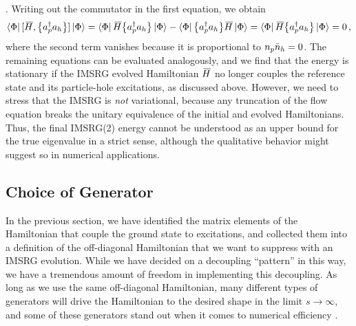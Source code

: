 \cite{Mukherjee:2001uq,Kutzelnigg:2002kx,Kutzelnigg:2004vn,Kutzelnigg:2004ys}. 
Writing out the commutator in the first equation, we obtain
\begin{equation}
  \langle{\Phi}|\,{[{\mkern 3mu\overline{\mkern-3muH}},{\big\{a^\dag_{p}a_{h}\big\}}]}\,|{\Phi}\rangle 
    = \langle{\Phi}|\,{\mkern 3mu\overline{\mkern-3muH}\big\{a^\dag_{p}a_{h}\big\}}\,|{\Phi}\rangle - \langle{\Phi}|\,{\big\{a^\dag_{p}a_{h}\big\}\mkern 3mu\overline{\mkern-3muH}}\,|{\Phi}\rangle
    = \langle{\Phi}|\,{\mkern 3mu\overline{\mkern-3muH}\big\{a^\dag_{p}a_{h}\big\}}\,|{\Phi}\rangle 
    = 0\,,
\end{equation}
where the second term vanishes because it is proportional to $n_p \bar{n}_h = 0$.
The remaining equations can be evaluated analogously, and we find that the
energy is stationary if the IMSRG evolved Hamiltonian $\mkern 3mu\overline{\mkern-3muH}$ no longer 
couples the reference state and its particle-hole excitations, as discussed 
above. However, we need to stress that the IMSRG is \emph{not} variational,
because any truncation of the flow equation breaks the unitary equivalence
of the initial and evolved Hamiltonians. Thus, the final IMSRG(2) energy
cannot be understood as an upper bound for the true eigenvalue in a strict
sense, although the qualitative behavior might suggest so in numerical
applications.

\subsection{\label{sec:imsrg_generator}Choice of Generator}
In the previous section, we have identified the matrix elements of the
Hamiltonian that couple the ground state to excitations, and collected
them into a definition of the off-diagonal Hamiltonian that we want to 
suppress with an IMSRG evolution. While we have decided on a decoupling 
``pattern'' in this way, we have a tremendous amount of freedom in 
implementing this decoupling. As long as we use the same off-diagonal
Hamiltonian, many different types of generators will drive the Hamiltonian
to the desired shape in the limit $s\to\infty$, and some of these generators
stand out when it comes to numerical efficiency \cite{Hergert:2016jk}. 

%
%
